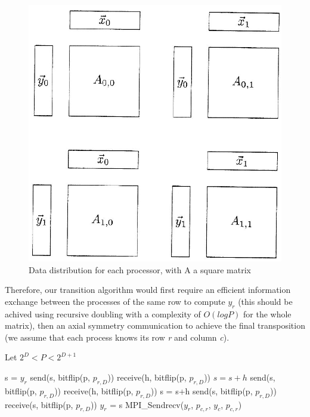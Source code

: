 \begin{figure}[H]
\centering
\includegraphics[width=0.7\linewidth]{img/matrix_multi.jpg}
\caption{Data distribution for each processor, with A a square matrix}
\end{figure}

Therefore, our transition algorithm would first require an efficient information exchange between the processes of the same row to compute $y_r$ (this should be achived using recursive doubling with a complexity of $O(log P)$ for the whole matrix), then an axial symmetry communication to achieve the final transposition (we assume that each process knows its row \textit{r} and column \textit{c}).

Let $2^D < P < 2^{D+1}$

\begin{algorithmic}
\State s = $y_r$ 
    \State send(s, bitflip(p, $p_{r,D}$))
\EndIf
{}
    \State receive(h, bitflip(p, $p_{r,D}$))
    \State $s = s + h$
\EndIf
{}
        \State send(s, bitflip(p, $p_{r,D}$))
        \State receive(h, bitflip(p, $p_{r,D}$))
        \State s = s+h
    \EndFor
\EndIf
{}
    \State send(s, bitflip(p, $p_{r,D}$))
\EndIf
{}
    \State receive(s, bitflip(p, $p_{r,D}$))
\EndIf
\State $y_r$ = s 
 
    \State MPI\_Sendrecv($y_r$, $p_{c,r}$, $y_c$, $p_{c,r}$) 
\EndIf
\end{algorithmic}

